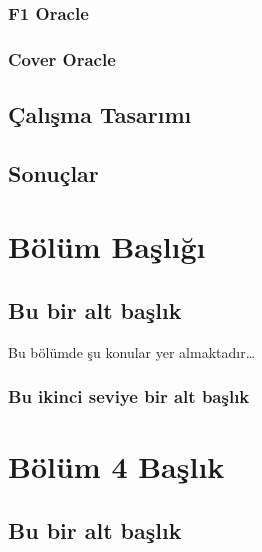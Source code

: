 \documentclass[12pt,twoside]{deuthesis}
\begin{document}
\hypertarget{f1-oracle-2}{%
\subsection{F1 Oracle}\label{f1-oracle-2}}

\hypertarget{cover-oracle-2}{%
\subsection{Cover Oracle}\label{cover-oracle-2}}

\hypertarget{uxe7alux131ux15fma-tasarux131mux131}{%
\section{Çalışma Tasarımı}\label{uxe7alux131ux15fma-tasarux131mux131}}

\hypertarget{sonuuxe7lar}{%
\section{Sonuçlar}\label{sonuuxe7lar}}

\hypertarget{Bolum4}{%
\chapter{Bölüm Başlığı}\label{Bolum4}}

\hypertarget{bu-bir-alt-baux15flux131k}{%
\section{Bu bir alt başlık}\label{bu-bir-alt-baux15flux131k}}

Bu bölümde şu konular yer almaktadır\ldots{}

\hypertarget{bu-ikinci-seviye-bir-alt-baux15flux131k}{%
\subsection{Bu ikinci seviye bir alt başlık}\label{bu-ikinci-seviye-bir-alt-baux15flux131k}}

\hypertarget{Bolum5}{%
\chapter{Bölüm 4 Başlık}\label{Bolum5}}

\hypertarget{bu-bir-alt-baux15flux131k-1}{%
\section{Bu bir alt başlık}\label{bu-bir-alt-baux15flux131k-1}}
\end{document}

